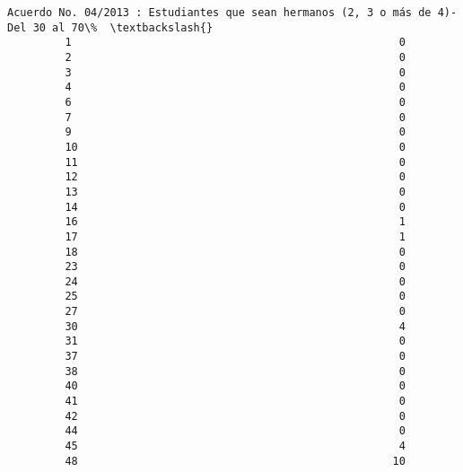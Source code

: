\documentclass[11pt]{article}
\begin{document}
\begin{Verbatim}[commandchars=\\\{\}]
             Acuerdo No. 04/2013 : Estudiantes que sean hermanos (2, 3 o más de 4)-Del 30 al 70\%  \textbackslash{}
         1                                                   0                                     
         2                                                   0                                     
         3                                                   0                                     
         4                                                   0                                     
         6                                                   0                                     
         7                                                   0                                     
         9                                                   0                                     
         10                                                  0                                     
         11                                                  0                                     
         12                                                  0                                     
         13                                                  0                                     
         14                                                  0                                     
         16                                                  1                                     
         17                                                  1                                     
         18                                                  0                                     
         23                                                  0                                     
         24                                                  0                                     
         25                                                  0                                     
         27                                                  0                                     
         30                                                  4                                     
         31                                                  0                                     
         37                                                  0                                     
         38                                                  0                                     
         40                                                  0                                     
         41                                                  0                                     
         42                                                  0                                     
         44                                                  0                                     
         45                                                  4                                     
         48                                                 10                                     
         

\end{Verbatim}
\end{document}
